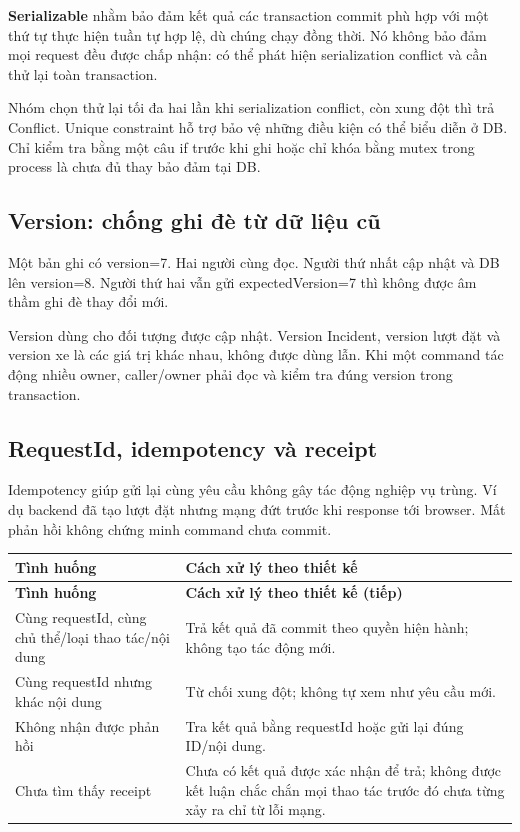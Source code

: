 \documentclass[12pt,a4paper]{article}
\newcommand{\Term}[1]{\textbf{#1}}
\newenvironment{PairTable}[2]{%
  \begin{longtable}{|L{39mm}|L{106mm}|}\hline
  \textbf{#1} & \textbf{#2}\\\hline\endfirsthead
  \hline\textbf{#1} & \textbf{#2 (tiếp)}\\\hline\endhead
}{\end{longtable}}
\begin{document}
\Term{Serializable} nhằm bảo đảm kết quả các transaction commit phù hợp với một thứ tự thực hiện tuần tự hợp lệ, dù chúng chạy đồng thời. Nó không bảo đảm mọi request đều được chấp nhận: có thể phát hiện serialization conflict và cần thử lại toàn transaction.

Nhóm chọn thử lại tối đa hai lần khi serialization conflict, còn xung đột thì trả Conflict. Unique constraint hỗ trợ bảo vệ những điều kiện có thể biểu diễn ở DB. Chỉ kiểm tra bằng một câu if trước khi ghi hoặc chỉ khóa bằng mutex trong process là chưa đủ thay bảo đảm tại DB.

\subsection{Version: chống ghi đè từ dữ liệu cũ}
Một bản ghi có version=7. Hai người cùng đọc. Người thứ nhất cập nhật và DB lên version=8. Người thứ hai vẫn gửi expectedVersion=7 thì không được âm thầm ghi đè thay đổi mới.

Version dùng cho đối tượng được cập nhật. Version Incident, version lượt đặt và version xe là các giá trị khác nhau, không được dùng lẫn. Khi một command tác động nhiều owner, caller/owner phải đọc và kiểm tra đúng version trong transaction.

\subsection{RequestId, idempotency và receipt}
Idempotency giúp gửi lại cùng yêu cầu không gây tác động nghiệp vụ trùng. Ví dụ backend đã tạo lượt đặt nhưng mạng đứt trước khi response tới browser. Mất phản hồi không chứng minh command chưa commit.

\begin{PairTable}{Tình huống}{Cách xử lý theo thiết kế}
Cùng requestId, cùng chủ thể/loại thao tác/nội dung & Trả kết quả đã commit theo quyền hiện hành; không tạo tác động mới.\\\hline
Cùng requestId nhưng khác nội dung & Từ chối xung đột; không tự xem như yêu cầu mới.\\\hline
Không nhận được phản hồi & Tra kết quả bằng requestId hoặc gửi lại đúng ID/nội dung.\\\hline
Chưa tìm thấy receipt & Chưa có kết quả được xác nhận để trả; không được kết luận chắc chắn mọi thao tác trước đó chưa từng xảy ra chỉ từ lỗi mạng.\\\hline
\end{PairTable}
\end{document}
